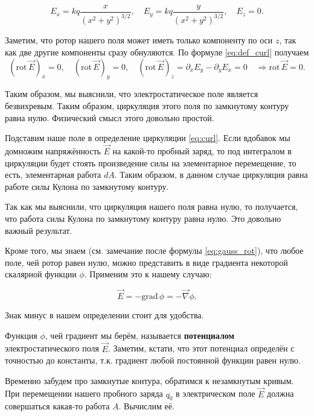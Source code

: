 \documentclass[a4paper,12pt]{article}
\numberwithin{equation}{section}
\newcommand{\pt}{\partial}
\newcommand{\grad}{\mathrm{grad}\,}
\newcommand{\rot}{\mathrm{rot}\,}
\newcommand{\vn}{\vec{\nabla}}
\begin{document}
\begin{equation}
  \label{eq:rot_electrostatics_1}
  E_x = kq \frac{x}{(x^2+y^2)^{3/2}}, \quad   E_y = kq
  \frac{y}{(x^2+y^2)^{3/2}}, \quad E_z =0. 
\end{equation}

Заметим, что ротор нашего поля может иметь только компоненту по оси
$z$, так как две другие компоненты сразу обнуляются. По формуле
\eqref{eq:def_curl} получаем
\begin{equation}
  \label{eq:rot_electrostatics_2}
 \left( \rot \vec{E} \right)_x =0, \quad  \left( \rot \vec{E}
 \right)_y =0, \quad \left( \rot \vec{E} \right)_z = \pt_x E_y - \pt_y
 E_x = 0 \quad \Rightarrow \rot \vec{E} =0.
\end{equation}

Таким образом, мы выяснили, что электростатическое поле является
безвихревым. Таким образом, циркуляция этого поля по замкнутому
контуру равна нулю. Физический смысл этого довольно простой. 

Подставим наше поле в определение циркуляции \eqref{eq:curl}. Если
вдобавок мы домножим напряжённость $\vec{E}$ на какой-то пробный
заряд, то под интегралом в циркуляции будет стоять произведение силы
на элементарное перемещение, то есть, элементарная работа $dA$. Таким
образом, в данном случае циркуляция равна работе силы Кулона по
замкнутому контуру. 

Так как мы выяснили, что циркуляция нашего поля равна нулю, то
получается, что работа силы Кулона по замкнутому контуру равна
нулю. Это довольно важный результат. 

Кроме того, мы знаем (см. замечание после формулы
\eqref{eq:gauss_rot}), что любое поле, чей ротор равен нулю, можно
представить в виде градиента некоторой скалярной функции
$\phi$. Применим это к нашему случаю:

\begin{equation}
  \label{eq:def_potential}
  \vec{E}  = -\grad \phi = -\vn \phi.
\end{equation}

Знак минус в нашем определении стоит для удобства.

Функция $\phi$, чей градиент мы берём, называется \textbf{потенциалом}
электростатического поля $\vec{E}$. Заметим, кстати, что этот
потенциал определён с точностью до константы, т.к. градиент любой
постоянной функции равен нулю. 

Временно забудем про замкнутые контура, обратимся к незамкнутым
кривым. При перемещении нашего пробного заряда $q_0$ в электрическом поле
$\vec{E}$ должна совершаться какая-то работа $A$. Вычислим её. 
\end{document}

